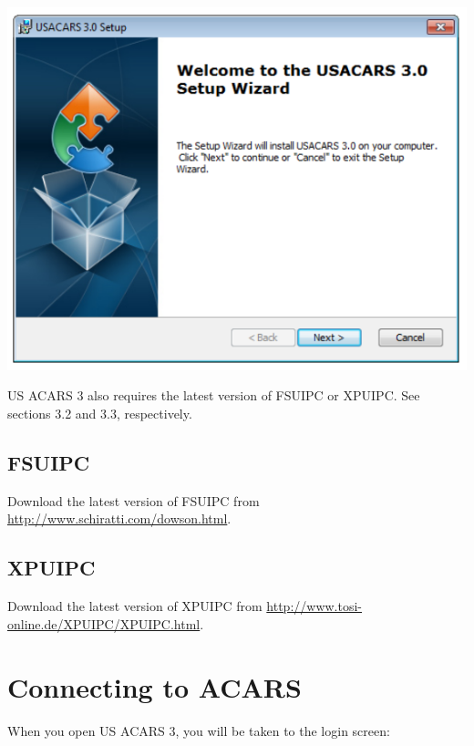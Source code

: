 \documentclass[12pt]{article}
\begin{document}
\begin{center}
\includegraphics[scale=1]{Image1.pdf}
\end{center}

US ACARS 3 also requires the latest version of FSUIPC or XPUIPC. See sections 3.2 and 3.3, respectively.

\subsection{FSUIPC}
Download the latest version of FSUIPC from \url{http://www.schiratti.com/dowson.html}.

\subsection{XPUIPC}
Download the latest version of XPUIPC from \url{http://www.tosi-online.de/XPUIPC/XPUIPC.html}.

\section{Connecting to ACARS}
When you open US ACARS 3, you will be taken to the login screen:
\end{document}
